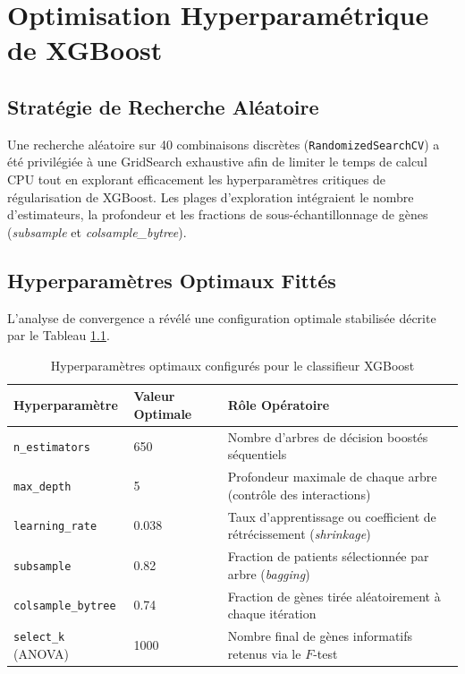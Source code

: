 \documentclass[12pt,a4paper]{report}
\let\oldchapter\chapter
\renewcommand{\chapter}{\clearpage\oldchapter}
\begin{document}
\chapter{Optimisation Hyperparam\'etrique de XGBoost}
\section{Strat\'egie de Recherche Al\'eatoire}
Une recherche al\'eatoire sur 40 combinaisons discr\`etes (\texttt{RandomizedSearchCV}) a \'et\'e privil\'egi\'ee \`a une GridSearch exhaustive afin de limiter le temps de calcul CPU tout en explorant efficacement les hyperparam\`etres critiques de r\'egularisation de XGBoost. Les plages d'exploration int\'egraient le nombre d'estimateurs, la profondeur et les fractions de sous-échantillonnage de g\`enes (\textit{subsample} et \textit{colsample\_bytree}).

\section{Hyperparam\`etres Optimaux Fitt\'es}
L'analyse de convergence a r\'ev\'el\'e une configuration optimale stabilis\'ee d\'ecrite par le Tableau \ref{tab:hyperparams}.

\begin{table}[H]
\centering
\caption{Hyperparam\`etres optimaux configur\'es pour le classifieur XGBoost}
\label{tab:hyperparams}
\begin{tabularx}{\textwidth}{lXX}
\toprule
\textbf{Hyperparam\`etre} & \textbf{Valeur Optimale} & \textbf{R\^ole Op\'eratoire} \\
\midrule
\texttt{n\_estimators} & 650 & Nombre d'arbres de d\'ecision boost\'es s\'equentiels \\
\texttt{max\_depth} & 5 & Profondeur maximale de chaque arbre (contr\^ole des interactions) \\
\texttt{learning\_rate} & 0.038 & Taux d'apprentissage ou coefficient de rétrécissement (\textit{shrinkage}) \\
\texttt{subsample} & 0.82 & Fraction de patients s\'electionn\'ee par arbre (\textit{bagging}) \\
\texttt{colsample\_bytree} & 0.74 & Fraction de g\`enes tir\'ee al\'eatoirement \`a chaque it\'eration \\
\texttt{select\_k} (ANOVA) & 1000 & Nombre final de g\`enes informatifs retenus via le $F$-test \\
\bottomrule
\end{tabularx}
\end{table}
\end{document}
